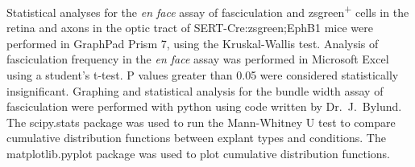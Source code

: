 Statistical analyses for the \emph{en face} assay of fasciculation and zsgreen\textsuperscript{+} cells in the retina and axons in the optic tract of SERT-Cre:zsgreen;EphB1 mice were performed in GraphPad Prism 7, using the Kruskal-Wallis test.
Analysis of fasciculation frequency in the \emph{en face} assay was performed in Microsoft Excel using a student's t-test.
P values greater than 0.05 were considered statistically insignificant.
Graphing and statistical analysis for the bundle width assay of fasciculation were performed with python using code written by Dr.~J.~Bylund.
The scipy.stats package was used to run the Mann-Whitney U test to compare cumulative distribution functions between explant types and conditions.
The matplotlib.pyplot package was used to plot cumulative distribution functions.